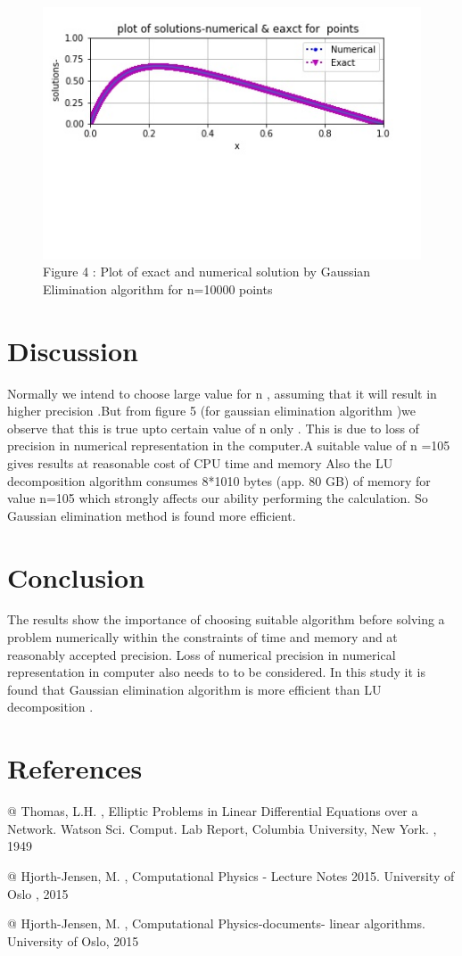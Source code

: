 \documentclass{article}
\begin{document}
\begin{figure}[h!]
\label{}
\includegraphics{gaussop4}
\centering
\caption{Figure 4 : Plot of exact and numerical solution by Gaussian Elimination algorithm for n=10000 points}
\label{}
\end{figure}
\section{Discussion}

Normally we intend to choose large value for n , assuming that it will result in higher precision .But from figure 5 (for gaussian elimination algorithm )we observe that this is true upto certain value of n only . This is due to loss of precision in numerical representation in the computer.A suitable value of n =105 gives results at reasonable cost of CPU time and memory 
Also the LU decomposition algorithm consumes 8*1010  bytes (app. 80 GB) of memory for value n=105   which strongly affects our ability performing the calculation.
So Gaussian elimination method is found more efficient.
\section{Conclusion}
The results show the importance of choosing suitable algorithm before solving a problem numerically within the constraints of time and memory and at reasonably accepted precision. Loss of numerical precision in numerical representation in computer also needs to to be considered.
In this study it is found that Gaussian elimination algorithm is more efficient than LU decomposition .
\section{References} 


@{ {Thomas, L.H. },
{ Elliptic Problems in Linear Differential Equations over a Network.
Watson Sci. Comput. Lab Report, Columbia University, New York. },
{1949}
}

@{ {Hjorth-Jensen, M.  },
{Computational Physics - Lecture Notes 2015. University of Oslo },
{2015}
}

@{ {Hjorth-Jensen, M. },
{Computational Physics-documents- linear algorithms. University of Oslo},
{2015}
}
\end{document}
